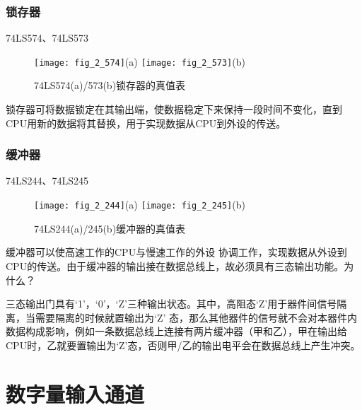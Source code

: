 \subsubsection{锁存器}

74LS574、74LS573\newline

\begin{figure}[h]
  \centering
  \texttt{[image: fig\_2\_574]}(a)
  \texttt{[image: fig\_2\_573]}(b)\\
  \caption{74LS574(a)/573(b)锁存器的真值表}\label{fig:fig_2_574}
\end{figure}



\begin{remark}
锁存器可将数据锁定在其输出端，使数据稳定下来保持一段时间不变化，直到CPU用新的数据将其替换，用于实现数据从CPU到外设的传送。
\end{remark}

\subsubsection{缓冲器}

74LS244、74LS245\newline


\begin{figure}[h]
  \centering
  \texttt{[image: fig\_2\_244]}(a)
  \texttt{[image: fig\_2\_245]}(b)\\
  \caption{74LS244(a)/245(b)缓冲器的真值表}\label{fig:fig_2_244}
\end{figure}



\begin{remark}
缓冲器可以使高速工作的CPU与慢速工作的外设 协调工作，实现数据从外设到CPU的传送。由于缓冲器的输出接在数据总线上，故必须具有三态输出功能。为什么？


三态输出门具有‘1’，‘0’，‘Z’三种输出状态。其中，高阻态‘Z’用于器件间信号隔离，当需要隔离的时候就置输出为‘Z’ 态，那么其他器件的信号就不会对本器件内数据构成影响，例如一条数据总线上连接有两片缓冲器（甲和乙），甲在输出给CPU时，乙就要置输出为‘Z’态，否则甲/乙的输出电平会在数据总线上产生冲突。

\end{remark}



\section{数字量输入通道}

